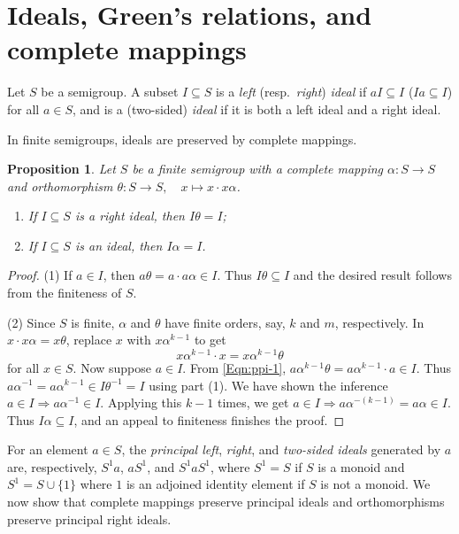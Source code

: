 \documentclass[11pt]{article}
\theoremstyle{plain}
\newtheorem{prop}[theorem]{Proposition}
\theoremstyle{remark}
\theoremstyle{definition}
\theoremstyle{plain}
\newcommand{\inv}{^{-1}}
\begin{document}
\section{Ideals, Green's relations, and complete mappings}
\label{Sec:ideals}

Let $S$ be a semigroup. A subset $I\subseteq S$ is a \emph{left} (resp.\ \emph{right}) \emph{ideal} if $aI\subseteq I$ ($Ia\subseteq I$) for all $a\in S$, and is a (two-sided) \emph{ideal} if it is both a left ideal and a right ideal.

In finite semigroups, ideals are preserved by complete mappings.

\begin{prop}\label{Prp:preserve_ideals}
Let $S$ be a finite semigroup with a complete mapping $\alpha\colon S\to S$ and orthomorphism $\theta\colon S\to S,\quad x\mapsto x\cdot x\alpha$.
\begin{enumerate}
    \item If $I\subseteq S$ is a right ideal, then $I\theta = I$;
    \item If $I\subseteq S$ is an ideal, then $I\alpha = I$.
\end{enumerate}
\end{prop}
\begin{proof}
(1) If $a\in I$, then $a\theta = a\cdot a\alpha\in I$. Thus $I\theta\subseteq I$ and the desired result follows from the finiteness of $S$.

\noindent (2) Since $S$ is finite, $\alpha$ and $\theta$ have finite orders, say, $k$ and $m$, respectively. In $x\cdot x\alpha = x\theta$, replace $x$ with $x\alpha^{k-1}$ to get
\begin{equation}\label{Eqn:ppi-1}
    x\alpha^{k-1} \cdot x = x\alpha^{k-1}\theta
\end{equation}
for all $x\in S$. Now suppose $a\in I$. From \eqref{Eqn:ppi-1}, $a\alpha^{k-1}\theta = a\alpha^{k-1} \cdot a \in I$. Thus $a\alpha\inv = a\alpha^{k-1} \in I\theta^{-1} = I$ using part (1). We have shown the inference $a\in I\Rightarrow a\alpha\inv\in I$. Applying this $k-1$ times, we get $a\in I\Rightarrow a\alpha^{-(k-1)}=a\alpha\in I$. Thus $I\alpha\subseteq I$, and an appeal to finiteness finishes the proof.
\end{proof}

For an element $a\in S$, the \emph{principal left}, \emph{right},
and \emph{two-sided ideals} generated by $a$ are, respectively, $S^1a$, $aS^1$, and $S^1 aS^1$, where $S^1 = S$ if $S$ is a monoid and $S^1 = S\cup \{1\}$ where $1$ is an adjoined identity element if $S$ is not a monoid.
We now show that complete mappings preserve principal ideals and orthomorphisms preserve principal right ideals.
\end{document}
